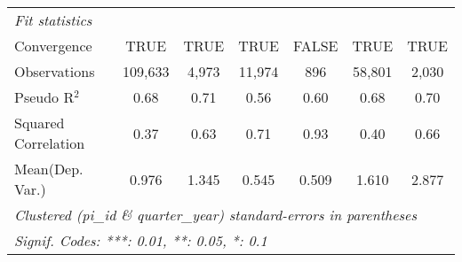 \begin{tabular}{lcccccc}
   \midrule
   \emph{Fit statistics}\\
   Convergence                                                &TRUE            & TRUE           & TRUE         & FALSE         & TRUE    & TRUE\\  
   Observations                                               & 109,633        & 4,973          & 11,974       & 896           & 58,801  & 2,030\\  
   Pseudo R$^2$                                               & 0.68           & 0.71           & 0.56         & 0.60          & 0.68    & 0.70\\  
   Squared Correlation                                        & 0.37           & 0.63           & 0.71         & 0.93          & 0.40    & 0.66\\  
Mean(Dep. Var.) & 0.976 & 1.345 & 0.545 & 0.509 & 1.610 & 2.877 \\
   \midrule \midrule
   \multicolumn{7}{l}{\emph{Clustered (pi\_id \& quarter\_year) standard-errors in parentheses}}\\
   \multicolumn{7}{l}{\emph{Signif. Codes: ***: 0.01, **: 0.05, *: 0.1}}\\
\end{tabular}
\par\endgroup
